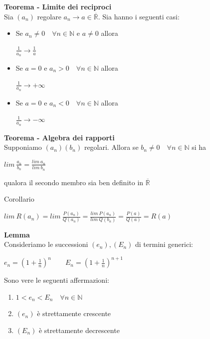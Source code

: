 \documentclass[12pt, a4paper]{article}
\begin{document}
    \textbf{Teorema - Limite dei reciproci}\\Sia $(a_{n})$ regolare $a_{n}\to a\in\overline{\mathbb{R}}$. Sia hanno i
    seguenti casi:
    \begin{itemize}
        \item Se $a_{n}\neq 0\quad\forall n\in\mathbb{N}$ e $a\neq 0$ allora \begin{center}
                  $\frac{1}{a_{n}}\to\frac{1}{a}$
              \end{center}
        \item Se $a=0$ e $a_{n}>0\quad\forall n\in\mathbb{N}$ allora \begin{center}
                  $\frac{1}{a_{n}}\to+\infty$
              \end{center}
        \item Se $a=0$ e $a_{n}<0\quad\forall n\in\mathbb{N}$ allora \begin{center}
                  $\frac{1}{a_{n}}\to-\infty$
              \end{center}
    \end{itemize}

    \textbf{Teorema - Algebra dei rapporti}\\Supponiamo $(a_{n})(b_{n})$ regolari. Allora se $b_{n}\neq 0\quad\forall
n\in\mathbb{N}$ si ha \begin{center}
        $lim\ \frac{a_{n}}{b_{n}}=\frac{lim\ a_{n}}{lim\ b_{n}}$
    \end{center}
    qualora il secondo membro sia ben definito in $\overline{\mathbb{R}}$

    Corollario
    \begin{center}
        $lim\ R(a_{n})=lim\ \frac{P(a_{n})}{Q(a_{n})}=\frac{lim\ P(a_{n})}{lim\ Q(b_{n})}=\frac{P(a)}{Q(a)}=R(a)$
    \end{center}

    \textbf{Lemma}\\Consideriamo le successioni $(e_{n}),(E_{n})$ di termini generici:
    \begin{center}
        $e_{n}=(1+\frac{1}{n})^{n}\qquad E_{n}=(1+\frac{1}{n})^{n+1}$
    \end{center}
    Sono vere le seguenti affermazioni:
    \begin{enumerate}
        \item $1<e_{n}<E_{n}\quad\forall n\in\mathbb{N}$
        \item $(e_{n})$ è strettamente crescente
        \item $(E_{n})$ è strettamente decrescente
    \end{enumerate}
\end{document}
